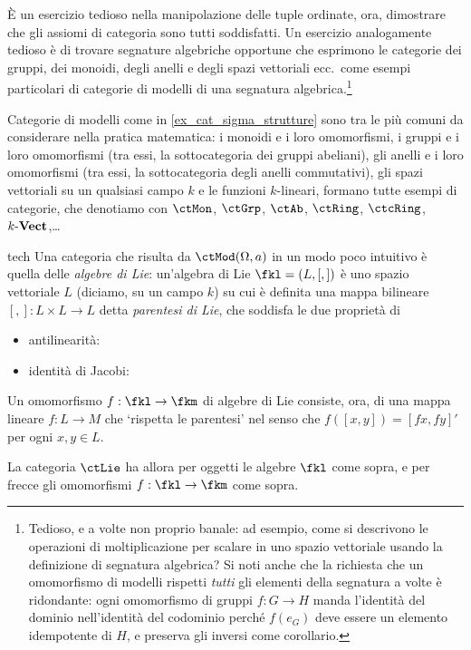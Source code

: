 È un esercizio tedioso nella manipolazione delle tuple ordinate, ora, dimostrare che gli assiomi di categoria sono tutti soddisfatti. Un esercizio analogamente tedioso è di trovare segnature algebriche opportune che esprimono le categorie dei gruppi, dei monoidi, degli anelli e degli spazi vettoriali ecc.\ come esempi particolari di categorie di modelli di una segnatura algebrica.\footnote{Tedioso, e a volte non proprio banale: ad esempio, come si descrivono le operazioni di moltiplicazione per scalare in uno spazio vettoriale usando la definizione di segnatura algebrica? Si noti anche che la richiesta che un omomorfismo di modelli rispetti \emph{tutti} gli elementi della segnatura a volte è ridondante: ogni omomorfismo di gruppi \(f \colon G\to H\) manda l'identità del dominio nell'identità del codominio perché \(f(e_G)\) deve essere un elemento idempotente di \(H\), e preserva gli inversi come corollario.}
\begin{remark}\label{varie_categorie_nella_pratica}
 Categorie di modelli come in \ref{ex_cat_sigma_strutture} sono tra le più comuni da considerare nella pratica matematica: i monoidi e i loro omomorfismi, i gruppi e i loro omomorfismi (tra essi, la sottocategoria dei gruppi abeliani), gli anelli e i loro omomorfismi (tra essi, la sottocategoria degli anelli commutativi), gli spazi vettoriali su un qualsiasi campo \(k\) e le funzioni \(k\)-lineari, formano tutte esempi di categorie, che denotiamo con \(\ctMon\), \(\ctGrp\), \(\ctAb\), \(\ctRing\), \(\ctcRing\), \(\ctVect[k]\),\dots
\end{remark}
\begin{hExample}{tech}
  Una categoria che risulta da $\ctMod(\Omega,a)$ in un modo poco intuitivo è quella delle \emph{algebre di Lie}: un'algebra di Lie $\fkl=(L,[,])$ è uno spazio vettoriale $L$ (diciamo, su un campo $k$) su cui è definita una mappa bilineare $[,] : L\times L \to L$ detta \emph{parentesi di Lie}, che soddisfa le due proprietà di 
  \begin{itemize}
    \item antilinearità:\Todo{}
    \item identità di Jacobi:\Todo{}
  \end{itemize}
  Un omomorfismo $f : \fkl \to \fkm$ di algebre di Lie consiste, ora, di una mappa lineare $f : L \to M$ che `rispetta le parentesi' nel senso che $f([x,y]) = [fx,fy]'$ per ogni $x,y\in L$.

  La categoria $\ctLie$ ha allora per oggetti le algebre $\fkl$ come sopra, e per frecce gli omomorfismi $f : \fkl \to \fkm$ come sopra.
\end{hExample}
